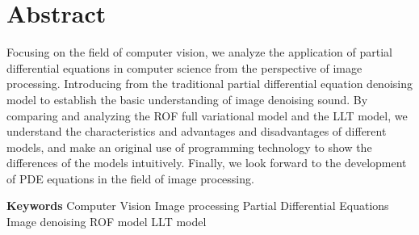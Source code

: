 \chapter{Abstract}
Focusing on the field of computer vision, we analyze the application of partial differential equations in computer science from the perspective of image processing. Introducing from the traditional partial differential equation denoising model to establish the basic understanding of image denoising sound. By comparing and analyzing the ROF full variational model and the LLT model, we understand the characteristics and advantages and disadvantages of different models, and make an original use of programming technology to show the differences of the models intuitively. Finally, we look forward to the development of PDE equations in the field of image processing.


{
    \vspace{1em}
    \setlength{\parindent}{0em}
    \textbf{Keywords} \; Computer Vision \; Image processing \; Partial Differential Equations \; \\
    Image denoising \; ROF model \; LLT model \par
}